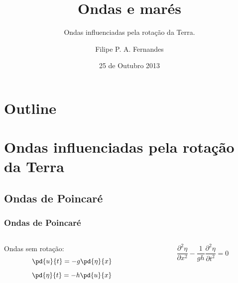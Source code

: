 \title[Aula 08]{Ondas e marés}
\subtitle{Ondas influenciadas pela rotação da Terra.}
\author[Filipe Fernandes]{Filipe P. A. Fernandes}
\date[Outubro 2013]{25 de Outubro 2013}




\begin{frame}[plain]
  \titlepage
\end{frame}

\section*{Outline}
\begin{frame}
\tableofcontents
\end{frame}

\section{Ondas influenciadas pela rotação da Terra}
\subsection{Ondas de Poincaré}
\begin{frame}
\frametitle{Ondas de Poincaré}
  \begin{columns}
    \begin{column}{0.5\textwidth}
    \begin{block}{}
      Ondas sem rotação:
      \[\pd{u}{t} = -g\pd{\eta}{x}\]
      \[\pd{\eta}{t} = -h\pd{u}{x}\]
    \end{block}
    \end{column}
    \begin{column}{0.5\textwidth}
    \begin{block}{}
      \[\frac{\partial^2\eta}{\partial x^2} - \frac{1}{gh}\frac{\partial^2\eta}{\partial{t^2}} = 0\]
    \end{block}
    \end{column}
  \end{columns}
\end{frame}

